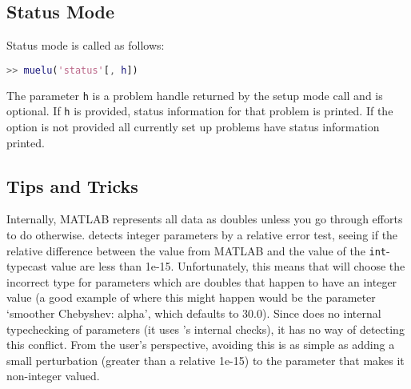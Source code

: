 \subsection{Status Mode}
Status mode is called as follows:
\begin{lstlisting}[language=Matlab]
  >> muelu('status'[, h])
\end{lstlisting}
The parameter \texttt{h} is a problem handle returned by the
setup mode call and is optional.  If \texttt{h} is provided, status
information for that problem is printed.  If the option is not provided all currently
set up problems have status information printed.

\subsection{Tips and Tricks }\label{sec:muemex:tips}

Internally, MATLAB represents all data as doubles unless you go
through efforts to do otherwise.  \muemex detects integer parameters by
a relative error test, seeing if the relative difference between the
value from MATLAB and the value of the \texttt{int}-typecast value are
less than 1e-15.  Unfortunately, this means that \muemex will choose the
incorrect type for parameters which are doubles that happen to have an
integer value (a good example of where this might happen would be the parameter
`smoother Chebyshev: alpha', which defaults to 30.0).  Since \muemex does no
internal typechecking of
parameters (it uses \muelu's internal checks), it has no way of detecting
this conflict.  From the user's perspective, avoiding this is as
simple as adding a small perturbation (greater than a relative 1e-15)
to the parameter that makes it non-integer valued.
